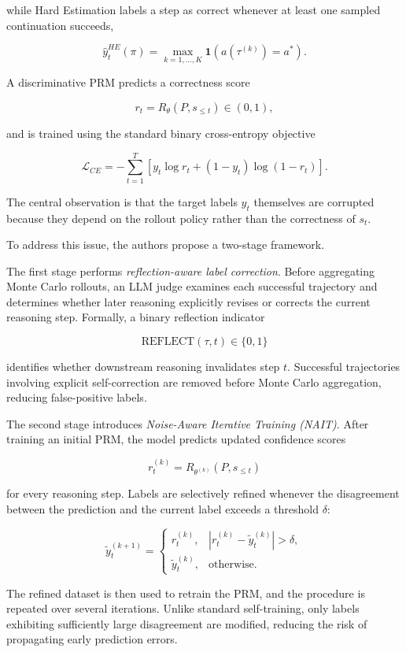\documentclass[11pt]{article}
\begin{document}
while Hard Estimation labels a step as correct whenever at least one sampled continuation succeeds,

\[
\hat y_t^{HE}(\pi)
=
\max_{k=1,\ldots,K}
\mathbf{1}
\left(
a(\tau^{(k)})=a^*
\right).
\]

A discriminative PRM predicts a correctness score

\[
r_t
=
R_\theta(P,s_{\le t})
\in(0,1),
\]

and is trained using the standard binary cross-entropy objective

\[
\mathcal{L}_{CE}
=
-
\sum_{t=1}^{T}
\left[
y_t\log r_t
+
(1-y_t)\log(1-r_t)
\right].
\]

The central observation is that the target labels \(y_t\) themselves are corrupted because they depend on the rollout policy rather than the correctness of \(s_t\).

To address this issue, the authors propose a two-stage framework.

The first stage performs \emph{reflection-aware label correction}. Before aggregating Monte Carlo rollouts, an LLM judge examines each successful trajectory and determines whether later reasoning explicitly revises or corrects the current reasoning step. Formally, a binary reflection indicator

\[
\mathrm{REFLECT}(\tau,t)\in\{0,1\}
\]

identifies whether downstream reasoning invalidates step \(t\). Successful trajectories involving explicit self-correction are removed before Monte Carlo aggregation, reducing false-positive labels.

The second stage introduces \emph{Noise-Aware Iterative Training (NAIT)}. After training an initial PRM, the model predicts updated confidence scores

\[
r_t^{(k)}
=
R_{\theta^{(k)}}(P,s_{\le t})
\]

for every reasoning step. Labels are selectively refined whenever the disagreement between the prediction and the current label exceeds a threshold \(\delta\):

\[
\tilde y_t^{(k+1)}
=
\begin{cases}
r_t^{(k)}, &
|r_t^{(k)}-\tilde y_t^{(k)}|>\delta,\\
\tilde y_t^{(k)}, &
\text{otherwise.}
\end{cases}
\]

The refined dataset is then used to retrain the PRM, and the procedure is repeated over several iterations. Unlike standard self-training, only labels exhibiting sufficiently large disagreement are modified, reducing the risk of propagating early prediction errors.
\end{document}
